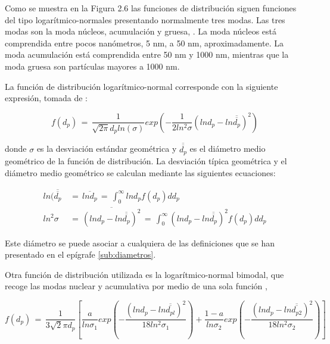 \par Como se muestra en la Figura 2.6 las funciones de distribución siguen funciones del tipo logarítmico-normales presentando normalmente tres modas. Las tres modas son la moda núcleos, acumulación y gruesa, \cite{kittlelsonetal:1998}. La moda núcleos está comprendida entre pocos nanómetros, 5 nm, a 50 nm, aproximadamente. La moda acumulación está comprendida entre 50 nm y 1000 nm, mientras que la moda gruesa son partículas mayores a 1000 nm.

\par La función de distribución logarítmico-normal corresponde con la siguiente expresión, tomada de \cite{friedlander:2000}:

\begin{equation}
\label{ec:distribucionlogaritmico-normal}
f(d_p)\,=\,\dfrac{1}{\sqrt{2 \pi} d_p ln(\sigma)} exp\left( -\dfrac{1}{2 ln^2 \sigma} \left( lnd_p - ln \overline{\overline{d_p}} \right)^2 \right)
\end{equation}

donde $\sigma$ es la desviación estándar geométrica y $\overline{\overline{d_p}}$ es el diámetro medio geométrico de la función de distribución. La desviación típica geométrica y el diámetro medio geométrico se calculan mediante las siguientes ecuaciones:

\begin{align}
\label{ec:desviaciontipicageometrica}
ln(\overline{\overline{d_p}}\, & =\,\overline{lnd_p}\,=\,\int_0^\infty lnd_p f(d_p) dd_p \\
\label{ec:diametromediogeometrico}
ln^2 \sigma\, & =\,\overline{\left(ln d_p - ln \overline{\overline{d_p}} \right)^2}\,=\, \int_0^\infty \left( lnd_p - ln \overline{\overline{d_p}} \right)^2 f(d_p)dd_p
\end{align}

\par Este diámetro se puede asociar a cualquiera de las definiciones que se han presentado en el epígrafe \ref{sub:diametros}.

\par Otra función de distribución utilizada es la logarítmico-normal bimodal, que recoge las modas nuclear y acumulativa por medio de una sola función \cite{kazakovetal:1998},

\begin{equation}
\label{ec:logartimico-normalbimodal}
f(d_p)\,=\,\dfrac{1}{3\sqrt{2} \pi d_p}\left[ \dfrac{a}{ln \sigma_1} exp\left( - \dfrac{\left( lnd_p - ln \overline{\overline{d_{pl}}} \right)^2}{18ln^2 \sigma_1} \right)  + \dfrac{1-a}{ln \sigma_2}exp\left( - \dfrac{\left( lnd_p - ln \overline{\overline{d_{p2}}} \right)^2}{18ln^2 \sigma_2} \right) \right]
\end{equation}

